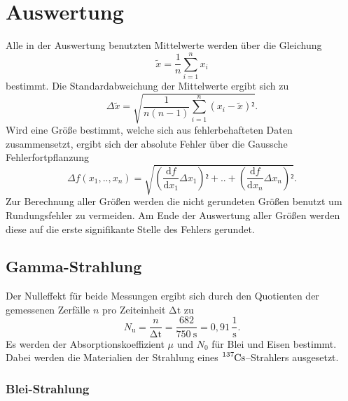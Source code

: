 \section{Auswertung}
\label{sec:Auswertung}
Alle in der Auswertung benutzten Mittelwerte werden über die Gleichung
\begin{equation}
\tilde{x}=\frac{1}{n}\sum_{i=1}^n {x_i}
\end{equation}
bestimmt. Die Standardabweichung der Mittelwerte ergibt sich zu 
\begin{equation}
\Delta{\tilde{x}}=\sqrt{\frac{1}{n(n-1)}\sum_{i=1}^n {(x_i-\tilde{x})²}}.
\end{equation}
Wird eine Größe bestimmt, welche sich aus fehlerbehafteten Daten zusammensetzt, ergibt sich der absolute Fehler über die Gaussche Fehlerfortpflanzung 
\begin{equation}
\Delta{f}(x_1,..,x_n)=\sqrt{\left(\frac{\mathup{d}f}{\mathup{d}x_1}\Delta{x_1}\right)²+..+\left(\frac{\mathup{d}f}{\mathup{d}x_n}\Delta{x_n}\right)²}.
\end{equation}
Zur Berechnung aller Größen werden die nicht gerundeten Größen benutzt um Rundungsfehler zu vermeiden. Am Ende der Auswertung aller Größen werden diese auf die erste signifikante Stelle des Fehlers gerundet. 

\subsection{Gamma-Strahlung}
Der Nulleffekt für beide Messungen ergibt sich durch den Quotienten der gemessenen Zerfälle $n$ pro Zeiteinheit ${\mathup{\Delta{t}}}$ zu
\begin{equation}
N_\mathup{u}=\frac{n}{\mathup{\Delta{t}}}=\frac{682}{\SI{750}{\second}}=0,91\,\frac{1}{\si\second}.
\end{equation}
Es werden der Absorptionskoeffizient $\mu$ und $N_0$ für Blei und Eisen bestimmt. Dabei werden die Materialien der Strahlung eines $\ce{^{137}Cs}$--Strahlers ausgesetzt. 
\subsubsection{Blei-Strahlung}

